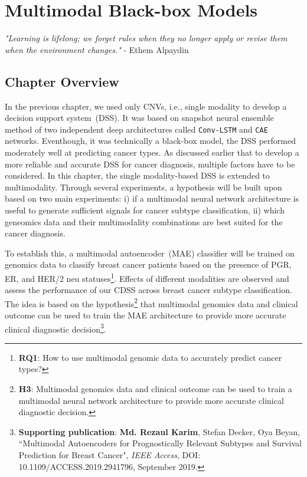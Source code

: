 \chapter{Multimodal Black-box Models}
\label{chapter:multiodality}

\textit{"Learning is lifelong; we forget rules when they no longer apply or revise them when the environment changes."} - Ethem Alpaydin 

\section{Chapter Overview}
In the previous chapter, we used only CNVs, i.e., single modality to develop a decision support system~(DSS). It was based on snapshot neural ensemble method of two independent deep architectures called \texttt{Conv-LSTM} and \texttt{CAE} networks. Eventhough, it was technically a black-box model, the DSS performed moderately well at predicting cancer types. As discussed earlier that to develop a more reliable and accurate DSS for cancer diagnosis, multiple factors have to be considered. In this chapter, the single modality-based DSS is extended to multimodality. Through several experiments, a hypothesis will be built upon based on two main experiments: i) if a multimodal neural network architecture is useful to generate sufficient signals for cancer subtype classification, ii) which geneomics data and their multimodality combinations are best suited for the cancer diagnosis.

\hspace*{3.5mm} To establish this, a multimodal autoencoder~(MAE) classifier will be trained on genomics data to classify breast cancer patients based on the presence of PGR, ER, and HER/2 neu statuses\footnote{\textbf{RQ1}: How to use multimodal genomic data to accurately predict cancer types?}. Effects of different modalities are observed and assess the performance of our CDSS across breast cancer subtype classification. The idea is based on the hypothesis\footnote{\textbf{H3}: Multimodal genomics data and clinical outcome can be used to train a multimodal neural network architecture to provide more accurate clinical diagnostic decision.} that multimodal genomics data and clinical outcome can be used to train the MAE architecture to provide more accurate clinical diagnostic decision\footnote{\textbf{Supporting publication}: \textbf{Md. Rezaul Karim}, Stefan Decker, Oya Beyan, ``Multimodal Autoencoders for Prognostically Relevant Subtypes and Survival Prediction for Breast Cancer", \emph{IEEE Access}, DOI: 10.1109/ACCESS.2019.2941796, September 2019.}. 

